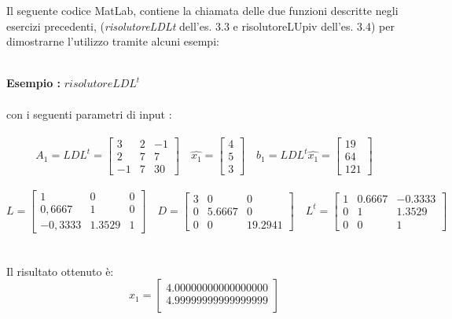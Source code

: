 Il seguente codice MatLab, contiene la chiamata delle due funzioni descritte negli esercizi precedenti, (\textit{risolutoreLDLt}  dell'es. 3.3 e risolutoreLUpiv dell'es. 3.4) per dimostrarne l'utilizzo tramite alcuni esempi:\\\
	
\begin{description}
	\item \textbf{Esempio :} \textit{$risolutoreLDL^t$}\\\\
		con i seguenti parametri di input :\\\	 
		\[
		A_1 = LDL^t =\begin{bmatrix}
			3 & 2 & -1 \\ 
			2 & 7 &  7 \\
			-1 & 7 & 30 
		\end{bmatrix} \quad
		\hat{x_1} =\begin{bmatrix}
			4 \\
			5 \\
			3                
		\end{bmatrix} \quad
		b_1 = LDL^t \hat{x_1} =\begin{bmatrix}
			19 \\
			64 \\
			121                
		\end{bmatrix}
		\]\\
		\[
		L =\begin{bmatrix}
			1 		& 0 	 & 0 \\ 
			0,6667  & 1 	 & 0 \\
	   		-0,3333 & 1.3529 & 1 
		\end{bmatrix} \quad
		D =\begin{bmatrix}
			3 & 0      & 0 	     \\ 
			0 & 5.6667 & 0       \\
			0 & 0      & 19.2941 
		\end{bmatrix} \quad
		L^t =\begin{bmatrix}
			1 & 0.6667 & -0.3333 \\ 
			0 & 1      &  1.3529 \\
			0 & 0      &  1 
		\end{bmatrix}
		\]\\\\
	Il risultato ottenuto è:\\
		\[
		x_1 =\begin{bmatrix}
			4.00000000000000000 \\
			4.99999999999999999 \\

\end{bmatrix}\]
\end{description}
